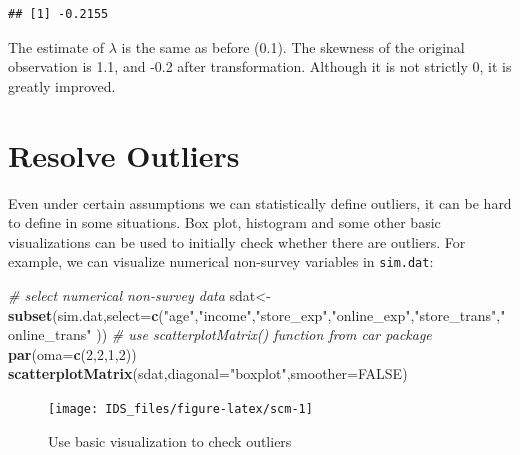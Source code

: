 \documentclass[12pt,]{krantz}
\newenvironment{Shaded}{\begin{snugshade}}{\end{snugshade}}
\newcommand{\KeywordTok}[1]{\textcolor[rgb]{0.13,0.29,0.53}{\textbf{{#1}}}}
\newcommand{\DataTypeTok}[1]{\textcolor[rgb]{0.13,0.29,0.53}{{#1}}}
\newcommand{\DecValTok}[1]{\textcolor[rgb]{0.00,0.00,0.81}{{#1}}}
\newcommand{\StringTok}[1]{\textcolor[rgb]{0.31,0.60,0.02}{{#1}}}
\newcommand{\CommentTok}[1]{\textcolor[rgb]{0.56,0.35,0.01}{\textit{{#1}}}}
\newcommand{\OtherTok}[1]{\textcolor[rgb]{0.56,0.35,0.01}{{#1}}}
\newcommand{\NormalTok}[1]{{#1}}
\theoremstyle{definition}
\theoremstyle{definition}
\theoremstyle{remark}
\begin{document}
\begin{Shaded}
\end{Shaded}

\begin{verbatim}
## [1] -0.2155
\end{verbatim}

The estimate of \(\lambda\) is the same as before (0.1). The skewness of
the original observation is 1.1, and -0.2 after transformation. Although
it is not strictly 0, it is greatly improved.

\section{Resolve Outliers}\label{resolve-outliers}

Even under certain assumptions we can statistically define outliers, it
can be hard to define in some situations. Box plot, histogram and some
other basic visualizations can be used to initially check whether there
are outliers. For example, we can visualize numerical non-survey
variables in \texttt{sim.dat}:

\begin{Shaded}
\begin{Highlighting}[]
\CommentTok{# select numerical non-survey data}
\NormalTok{sdat<-}\KeywordTok{subset}\NormalTok{(sim.dat,}\DataTypeTok{select=}\KeywordTok{c}\NormalTok{(}\StringTok{"age"}\NormalTok{,}\StringTok{"income"}\NormalTok{,}\StringTok{"store_exp"}\NormalTok{,}\StringTok{"online_exp"}\NormalTok{,}\StringTok{"store_trans"}\NormalTok{,}\StringTok{"online_trans"} \NormalTok{))}
\CommentTok{# use scatterplotMatrix() function from car package}
\KeywordTok{par}\NormalTok{(}\DataTypeTok{oma=}\KeywordTok{c}\NormalTok{(}\DecValTok{2}\NormalTok{,}\DecValTok{2}\NormalTok{,}\DecValTok{1}\NormalTok{,}\DecValTok{2}\NormalTok{))}
\KeywordTok{scatterplotMatrix}\NormalTok{(sdat,}\DataTypeTok{diagonal=}\StringTok{"boxplot"}\NormalTok{,}\DataTypeTok{smoother=}\OtherTok{FALSE}\NormalTok{)}
\end{Highlighting}
\end{Shaded}

\begin{figure}

{\centering \texttt{[image: IDS\_files/figure-latex/scm-1]} 

}

\caption{Use basic visualization to check outliers}\label{fig:scm}
\end{figure}
\end{document}
